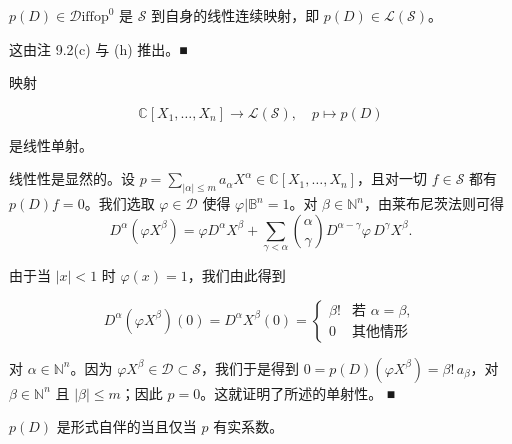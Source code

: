 \begin{remark}

\begin{items}
\item

$ p(D) \in \mathcal{D}\mathrm{iffop}^0 $ 是 $ \mathcal{S} $ 到自身的线性连续映射，即 $ p(D) \in \mathcal{L}(\mathcal{S}) $。

\proofhead
这由注 9.2(c) 与 (h) 推出。\nobreak\hspace{0.35em}■
\end{items}

\begin{items}
\item[（b）]

映射

\begin{equation}
\mathbb{C}[X_1,\ldots,X_n] \to \mathcal{L}(\mathcal{S}), \quad p \mapsto p(D)\tag{9.16}
\end{equation}

是线性单射。

\proofhead
线性性是显然的。设 $ p = \sum_{|\alpha| \le m} a_\alpha X^\alpha \in \mathbb{C}[X_1,\ldots,X_n] $，且对一切 $ f \in \mathcal{S} $ 都有 $ p(D)f = 0 $。我们选取 $ \varphi \in \mathcal{D} $ 使得 $ \varphi | \mathbb{B}^n = 1 $。对 $ \beta \in \mathbb{N}^n $，由莱布尼茨法则可得
\[
D^\alpha(\varphi X^\beta) = \varphi D^\alpha X^\beta + \sum_{\gamma < \alpha} \binom{\alpha}{\gamma} D^{\alpha-\gamma}\varphi\, D^\gamma X^\beta .
\]

由于当 $ |x| < 1 $ 时 $ \varphi(x) = 1 $，我们由此得到

\begin{equation*}
D^\alpha(\varphi X^\beta)(0) = D^\alpha X^\beta(0) = \begin{cases} \beta! & \text{若 } \alpha = \beta , \\ 0 & \text{其他情形} \end{cases}
\end{equation*}

对 $ \alpha \in \mathbb{N}^n $。因为 $ \varphi X^\beta \in \mathcal{D} \subset \mathcal{S} $，我们于是得到 $ 0 = p(D)(\varphi X^\beta) = \beta!\, a_\beta $，对 $ \beta \in \mathbb{N}^n $ 且 $ |\beta| \le m $；因此 $ p = 0 $。这就证明了所述的单射性。 \nobreak\hspace{0.35em}■

\item[（c）]

$ p(D) $ 是形式自伴的当且仅当 $ p $ 有实系数。


\end{items}
\end{remark}
